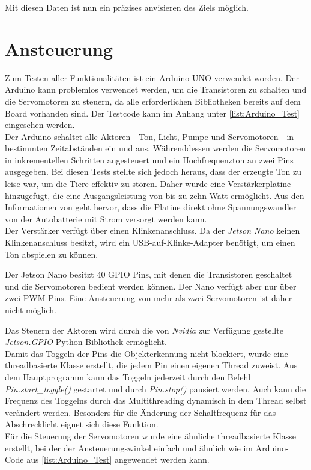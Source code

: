 Mit diesen Daten ist nun ein präzises anvisieren des Ziels möglich.

\section{Ansteuerung}

Zum Testen aller Funktionalitäten ist ein Arduino UNO verwendet worden. Der Arduino kann problemlos verwendet werden, um die Transistoren zu schalten und die Servomotoren zu steuern, da alle erforderlichen Bibliotheken bereits auf dem Board vorhanden sind. Der Testcode kann im Anhang unter \ref{list:Arduino_Test} eingesehen werden.
\\
Der Arduino schaltet alle Aktoren - Ton, Licht, Pumpe und Servomotoren - in bestimmten Zeitabständen ein und aus. Währenddessen werden die Servomotoren in inkrementellen Schritten angesteuert und ein Hochfrequenzton an zwei Pins ausgegeben. Bei diesen Tests stellte sich jedoch heraus, dass der erzeugte Ton zu leise war, um die Tiere effektiv zu stören. Daher wurde eine Verstärkerplatine hinzugefügt, die eine Ausgangsleistung von bis zu zehn Watt ermöglicht. Aus den Informationen von \cite{am_sound_amp} geht hervor, dass die Platine direkt ohne Spannungswandler von der Autobatterie mit Strom versorgt werden kann.
\\
Der Verstärker verfügt über einen Klinkenanschluss. Da der \textit{Jetson Nano} keinen Klinkenanschluss besitzt, wird ein USB-auf-Klinke-Adapter benötigt, um einen Ton abspielen zu können.

Der Jetson Nano besitzt 40 \ac{GPIO} Pins, mit denen die Transistoren geschaltet und die Servomotoren bedient werden können. Der Nano verfügt aber nur über zwei \ac{PWM} Pins. Eine Ansteuerung von mehr als zwei Servomotoren ist daher nicht möglich. \cite{jn_datasheet}

Das Steuern der Aktoren wird durch die von \textit{Nvidia} zur Verfügung gestellte \textit{Jetson.GPIO} Python Bibliothek ermöglicht. \cite{git_jn_gpio}
\\
Damit das Toggeln der Pins die Objekterkennung nicht blockiert, wurde eine threadbasierte Klasse erstellt, die jedem Pin einen eigenen Thread zuweist. Aus dem Hauptprogramm kann das Toggeln jederzeit durch den Befehl \textit{Pin.start\_toggle()} gestartet und durch \textit{Pin.stop()} pausiert werden. Auch kann die Frequenz des Toggelns durch das Multithreading dynamisch in dem Thread selbst verändert werden. Besonders für die Änderung der Schaltfrequenz für das Abschrecklicht eignet sich diese Funktion.
\\
Für die Steuerung der Servomotoren wurde eine ähnliche threadbasierte Klasse erstellt, bei der der Ansteuerungswinkel einfach und ähnlich wie im Arduino-Code aus \ref{list:Arduino_Test} angewendet werden kann.

